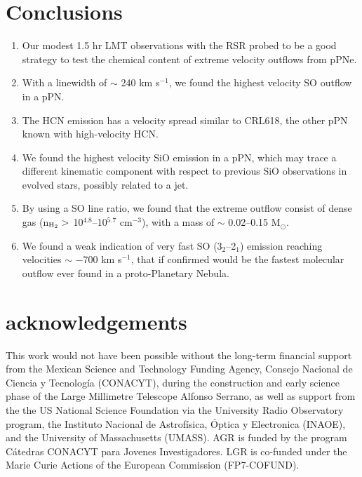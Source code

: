 \documentclass[a4paper,fleqn,usenatbib]{mnras}
\begin{document}
\section{Conclusions}

    \begin{enumerate}
      \item Our modest 1.5 hr LMT observations with the RSR probed to be a good strategy to test the chemical content of extreme velocity outflows from pPNe.
      \item With a linewidth of $\sim$ 240 km s$^{-1}$, we found the highest velocity SO outflow in a pPN. 
     \item The HCN emission has a velocity spread similar to CRL618, the other pPN known with high-velocity HCN.
     \item We found the highest velocity SiO emission in a pPN, which may trace a different kinematic component with respect to previous SiO observations in evolved stars, possibly related to a jet.   
\item By using a SO line ratio, we found that the extreme outflow consist of dense gas (n$_{\rm H_2} >$ 10$^{4.8}$--10$^{5.7}$ cm$^{-3}$), with a mass of $\sim$ 0.02--0.15 M$_{\odot}$.
\item We found a weak indication of very fast SO (3$_2$--2$_1$) emission reaching velocities $\sim$ $-$700 km s$^{-1}$, that if confirmed would be the fastest molecular outflow ever found in a proto-Planetary Nebula.
    \end{enumerate}

\section{acknowledgements}

This work would not have been possible without the long-term financial support from the Mexican Science and Technology Funding Agency, Consejo Nacional de Ciencia y Tecnolog\'ia (CONACYT), during the construction and early science phase of the Large Millimetre Telescope Alfonso Serrano, as well as support from the the US National Science Foundation via the University Radio Observatory program, the Instituto Nacional de Astrof\'isica, \'Optica y Electronica (INAOE), and the University of Massachusetts (UMASS). AGR is funded by the program C\'atedras CONACYT para Jovenes Investigadores. LGR is co-funded under the Marie Curie Actions of the European Commission (FP7-COFUND). 



\end{document}
